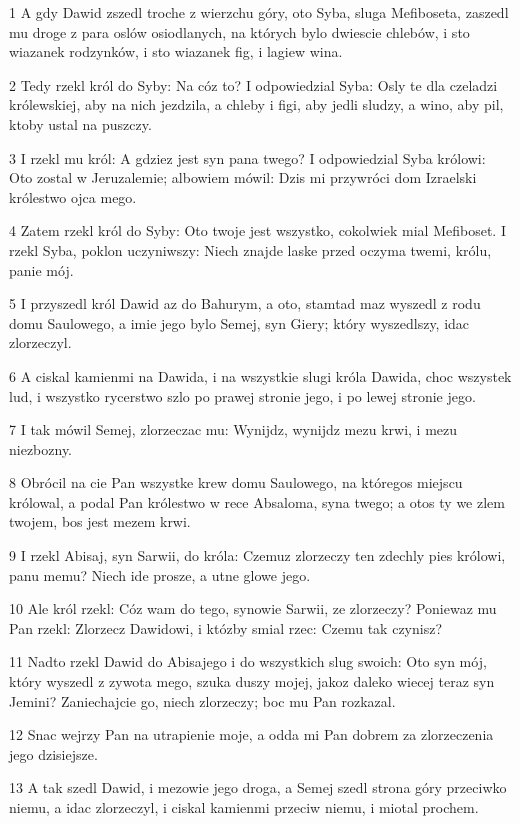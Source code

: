 \par 1 A gdy Dawid zszedl troche z wierzchu góry, oto Syba, sluga Mefiboseta, zaszedl mu droge z para oslów osiodlanych, na których bylo dwiescie chlebów, i sto wiazanek rodzynków, i sto wiazanek fig, i lagiew wina.
\par 2 Tedy rzekl król do Syby: Na cóz to? I odpowiedzial Syba: Osly te dla czeladzi królewskiej, aby na nich jezdzila, a chleby i figi, aby jedli sludzy, a wino, aby pil, ktoby ustal na puszczy.
\par 3 I rzekl mu król: A gdziez jest syn pana twego? I odpowiedzial Syba królowi: Oto zostal w Jeruzalemie; albowiem mówil: Dzis mi przywróci dom Izraelski królestwo ojca mego.
\par 4 Zatem rzekl król do Syby: Oto twoje jest wszystko, cokolwiek mial Mefiboset. I rzekl Syba, poklon uczyniwszy: Niech znajde laske przed oczyma twemi, królu, panie mój.
\par 5 I przyszedl król Dawid az do Bahurym, a oto, stamtad maz wyszedl z rodu domu Saulowego, a imie jego bylo Semej, syn Giery; który wyszedlszy, idac zlorzeczyl.
\par 6 A ciskal kamienmi na Dawida, i na wszystkie slugi króla Dawida, choc wszystek lud, i wszystko rycerstwo szlo po prawej stronie jego, i po lewej stronie jego.
\par 7 I tak mówil Semej, zlorzeczac mu: Wynijdz, wynijdz mezu krwi, i mezu niezbozny.
\par 8 Obrócil na cie Pan wszystke krew domu Saulowego, na któregos miejscu królowal, a podal Pan królestwo w rece Absaloma, syna twego; a otos ty we zlem twojem, bos jest mezem krwi.
\par 9 I rzekl Abisaj, syn Sarwii, do króla: Czemuz zlorzeczy ten zdechly pies królowi, panu memu? Niech ide prosze, a utne glowe jego.
\par 10 Ale król rzekl: Cóz wam do tego, synowie Sarwii, ze zlorzeczy? Poniewaz mu Pan rzekl: Zlorzecz Dawidowi, i któzby smial rzec: Czemu tak czynisz?
\par 11 Nadto rzekl Dawid do Abisajego i do wszystkich slug swoich: Oto syn mój, który wyszedl z zywota mego, szuka duszy mojej, jakoz daleko wiecej teraz syn Jemini? Zaniechajcie go, niech zlorzeczy; boc mu Pan rozkazal.
\par 12 Snac wejrzy Pan na utrapienie moje, a odda mi Pan dobrem za zlorzeczenia jego dzisiejsze.
\par 13 A tak szedl Dawid, i mezowie jego droga, a Semej szedl strona góry przeciwko niemu, a idac zlorzeczyl, i ciskal kamienmi przeciw niemu, i miotal prochem.

